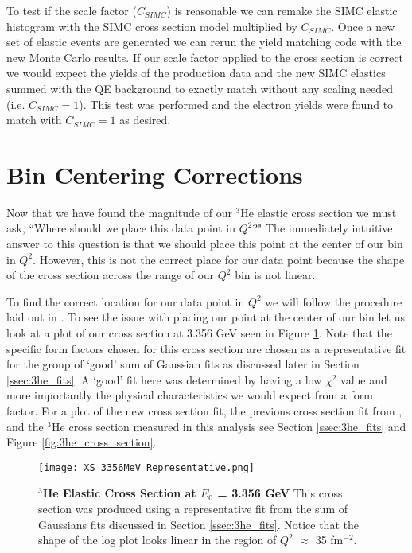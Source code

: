 To test if the scale factor ($C_{SIMC}$) is reasonable we can remake the SIMC elastic histogram with the SIMC cross section model multiplied by $C_{SIMC}$. Once a new set of elastic events are generated we can rerun the yield matching code with the new Monte Carlo results. If our scale factor applied to the cross section is correct we would expect the yields of the production data and the new SIMC elastics summed with the QE background to exactly match without any scaling needed (i.e. $C_{SIMC}=1$). This test was performed and the electron yields were found to match with $C_{SIMC}=1$ as desired.

\section{Bin Centering Corrections}
\label{sec:bin_cor}

Now that we have found the magnitude of our $^3$He elastic cross section we must ask, ``Where should we place this data point in $Q^2$?" The immediately intuitive answer to this question is that we should place this point at the center of our bin in $Q^2$. However, this is not the correct place for our data point because the shape of the cross section across the range of our $Q^2$ bin is not linear.
 
To find the correct location for our data point in $Q^2$ we will follow the procedure laid out in \cite{Article:data_placement}. To see the issue with placing our point at the center of our bin let us look at a plot of our cross section at 3.356 GeV seen in Figure \ref{fig:xs_bin}. Note that the specific form factors chosen for this cross section are chosen as a representative fit for the group of `good' sum of Gaussian fits as discussed later in Section \ref{ssec:3he_fits}. A `good' fit here was determined by having a low $\chi^2$ value and more importantly the physical characteristics we would expect from a form factor. For a plot of the new cross section fit, the previous cross section fit from \cite{Article:Amroun}, and the $^3$He cross section measured in this analysis see Section \ref{ssec:3he_fits} and Figure \ref{fig:3he_cross_section}.

\begin{figure}[!ht]
\begin{center}
\texttt{[image: XS\_3356MeV\_Representative.png]}
\end{center}
\caption[$^3$He Elastic Cross Section at $E_0$ = 3.356 GeV]{
{\bf{$^3$He Elastic Cross Section at $E_0$ = 3.356 GeV}} This cross section was produced using a representative fit from the sum of Gaussians fits discussed in Section \ref{ssec:3he_fits}. Notice that the shape of the log plot looks linear in the region of $Q^2$ $\approx$ 35 fm$^{-2}$.}
\label{fig:xs_bin}
\end{figure}


